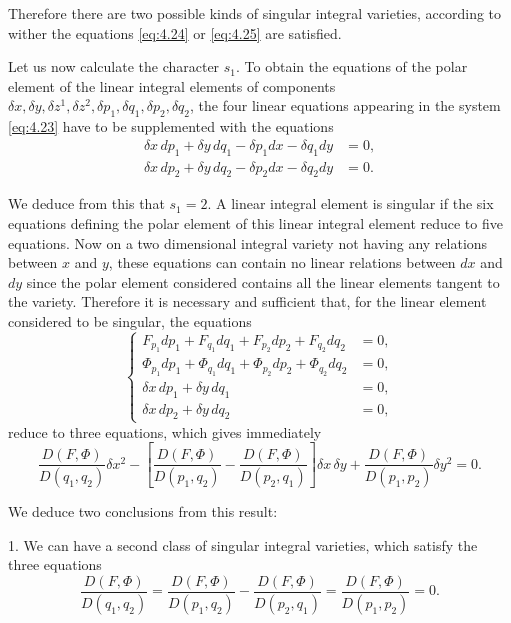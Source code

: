 \documentclass[leqno,11pt]{book}
\numberwithin{equation}{chapter}
\theoremstyle{shape1}
\theoremstyle{shape0}
\theoremstyle{shape2}
\theoremstyle{definition}
\begin{document}
Therefore there are two possible kinds of singular integral varieties, according to wither the equations \eqref{eq:4.24} or \eqref{eq:4.25} are satisfied.

Let us now calculate the character $s_{1}$. To obtain the equations of the polar element of the linear integral elements of components $\delta x,\delta y, \delta z^{1},\delta z^{2},\delta p_{1},\delta q_{1}, \delta p_{2}, \delta q_{2}$, the four linear equations appearing in the system \eqref{eq:4.23} have to be supplemented with the equations
\begin{align*}
  \delta x\,dp_{1}+\delta y\,dq_{1}-\delta p_{1}dx-\delta q_{1}dy&=0,\\
  \delta x\,dp_{2}+\delta y\,dq_{2}-\delta p_{2}dx-\delta q_{2}dy&=0.
\end{align*}

We deduce from this that $s_{1}=2$. A linear integral element is singular if the six equations defining the polar element of this linear integral element reduce to five equations. Now on a two dimensional integral variety not having any relations between $x$ and $y$, these equations can contain no linear relations between $dx$ and $dy$ since the polar element considered contains all the linear elements tangent to the variety. Therefore it is necessary and sufficient that, for the linear element considered to be singular, the equations
\begin{equation}
  \label{eq:4.26}
  \left\{
    \begin{aligned}
      F_{p_{1}}dp_{1}+F_{q_{1}}dq_{1}+F_{p_{2}}dp_{2}+F_{q_{2}}dq_{2}&=0,\\
      \Phi_{p_{1}}dp_{1}+\Phi_{q_{1}}dq_{1}+\Phi_{p_{2}}dp_{2}+\Phi_{q_{2}}dq_{2}&=0,\\
      \delta x\,dp_{1}+\delta y\,dq_{1}&=0,\\
      \delta x\,dp_{2}+\delta y\,dq_{2}&=0,
    \end{aligned}
\right.
\end{equation}
reduce to three equations, which gives immediately
\begin{equation}
  \label{eq:4.27}
  \frac{D(F,\Phi)}{D(q_{1},q_{2})}\delta x^{2}-\left[\frac{D(F,\Phi)}{D(p_{1},q_{2})}-\frac{D(F,\Phi)}{D(p_{2},q_{1})}\right]\delta x\,\delta y+\frac{D(F,\Phi)}{D(p_{1},p_{2})}\delta y^{2}=0.
\end{equation}

We deduce two conclusions from this result:

1. We can have a second class of singular integral varieties, which satisfy the three equations
\begin{equation}
  \label{eq:4.28}
  \frac{D(F,\Phi)}{D(q_{1},q_{2})}=\frac{D(F,\Phi)}{D(p_{1},q_{2})}-\frac{D(F,\Phi)}{D(p_{2},q_{1})}=\frac{D(F,\Phi)}{D(p_{1},p_{2})}=0.
\end{equation}
\end{document}
